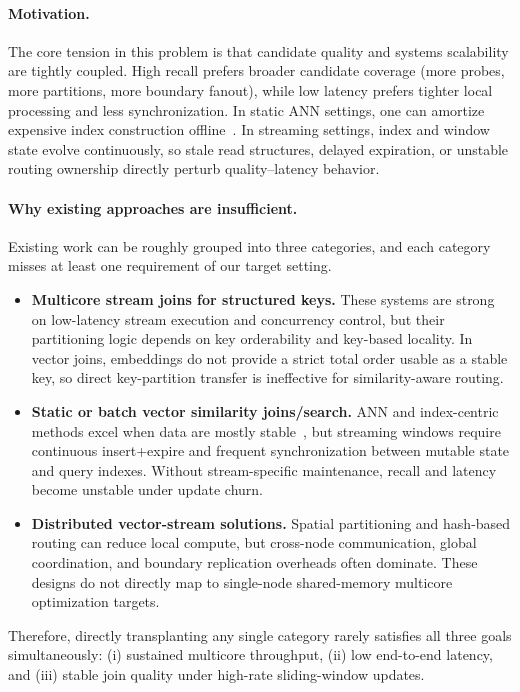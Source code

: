 \paragraph{Motivation.}
The core tension in this problem is that candidate quality and systems scalability are tightly coupled. High recall prefers broader candidate coverage (more probes, more partitions, more boundary fanout), while low latency prefers tighter local processing and less synchronization. In static ANN settings, one can amortize expensive index construction offline~\cite{jegou2011product,malkov2018efficient}. In streaming settings, index and window state evolve continuously, so stale read structures, delayed expiration, or unstable routing ownership directly perturb quality--latency behavior.

\paragraph{Why existing approaches are insufficient.}
Existing work can be roughly grouped into three categories, and each category misses at least one requirement of our target setting.
\begin{itemize}
	\item \textbf{Multicore stream joins for structured keys.} These systems are strong on low-latency stream execution and concurrency control, but their partitioning logic depends on key orderability and key-based locality. In vector joins, embeddings do not provide a strict total order usable as a stable key, so direct key-partition transfer is ineffective for similarity-aware routing.
	\item \textbf{Static or batch vector similarity joins/search.} ANN and index-centric methods excel when data are mostly stable~\cite{jegou2011product,malkov2018efficient}, but streaming windows require continuous insert+expire and frequent synchronization between mutable state and query indexes. Without stream-specific maintenance, recall and latency become unstable under update churn.
	\item \textbf{Distributed vector-stream solutions.} Spatial partitioning and hash-based routing can reduce local compute, but cross-node communication, global coordination, and boundary replication overheads often dominate. These designs do not directly map to single-node shared-memory multicore optimization targets.
\end{itemize}

Therefore, directly transplanting any single category rarely satisfies all three goals simultaneously: (i) sustained multicore throughput, (ii) low end-to-end latency, and (iii) stable join quality under high-rate sliding-window updates.

